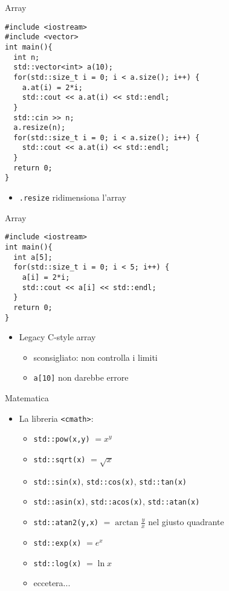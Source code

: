 \begin{frame}[fragile]{Array}
  \vfill
  \begin{lstlisting}
#include <iostream>
#include <vector>
int main(){
  int n;
  std::vector<int> a(10);
  for(std::size_t i = 0; i < a.size(); i++) {
    a.at(i) = 2*i;
    std::cout << a.at(i) << std::endl;
  }
  std::cin >> n;
  a.resize(n);
  for(std::size_t i = 0; i < a.size(); i++) {
    std::cout << a.at(i) << std::endl;
  }
  return 0;
}
  \end{lstlisting}
  \vfill
  \begin{itemize}
    \item \lstinline$.resize$ ridimensiona l'array
  \end{itemize}
  \vfill
\end{frame}

\begin{frame}[fragile]{Array}
  \vfill
  \begin{lstlisting}
#include <iostream>
int main(){
  int a[5];
  for(std::size_t i = 0; i < 5; i++) {
    a[i] = 2*i;
    std::cout << a[i] << std::endl;
  }
  return 0;
}
  \end{lstlisting}
  \vfill
  \begin{itemize}
    \item Legacy C-style array
    \begin{itemize}
      \item sconsigliato: non controlla i limiti
      \item \lstinline$a[10]$ non darebbe errore
    \end{itemize}
  \end{itemize}
  \vfill
\end{frame}

\begin{frame}[fragile]{Matematica}
  \vfill
  \begin{itemize}
    \item La libreria \lstinline$<cmath>$:
    \begin{itemize}
      \item \lstinline$std::pow(x,y)$ \( = x^y\)
      \item \lstinline$std::sqrt(x)$ \( = \sqrt{x}\)
      \item \lstinline$std::sin(x)$, \lstinline$std::cos(x)$, \lstinline$std::tan(x)$
      \item \lstinline$std::asin(x)$, \lstinline$std::acos(x)$, \lstinline$std::atan(x)$
      \item \lstinline$std::atan2(y,x)$  \( = \arctan{\frac{y}{x}}\) nel giusto quadrante
      \item \lstinline$std::exp(x)$ \( = e^x\)
      \item \lstinline$std::log(x)$ \( = \ln{x}\)
      \item eccetera...
    \end{itemize}
  \end{itemize}
  \vfill
\end{frame}

